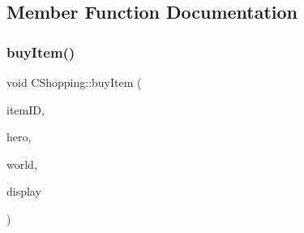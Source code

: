 \subsection{Member Function Documentation}
\mbox{\label{class_c_shopping_a0981a7916cca8a37beb35858ad2ec77e}} 
\subsubsection{\texorpdfstring{buy\+Item()}{buyItem()}}
{\footnotesize\ttfamily void C\+Shopping\+::buy\+Item (\begin{DoxyParamCaption}\item[{int}]{item\+ID,  }\item[{\mbox{\hyperlink{class_c_hero}{C\+Hero}} \&}]{hero,  }\item[{const \mbox{\hyperlink{class_c_world}{C\+World}} \&}]{world,  }\item[{const \mbox{\hyperlink{class_c_display}{C\+Display}} \&}]{display }\end{DoxyParamCaption})\hspace{0.3cm}{\ttfamily [protected]}}

